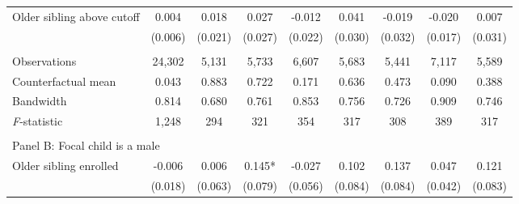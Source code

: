 \begin{table}[!htbp]
{{\begin{tabular}{lcccccccc}
Older sibling above cutoff&       0.004   &       0.018   &       0.027   &      -0.012   &       0.041   &      -0.019   &      -0.020   &       0.007   \\
                    &     (0.006)   &     (0.021)   &     (0.027)   &     (0.022)   &     (0.030)   &     (0.032)   &     (0.017)   &     (0.031)   \\
                    &               &               &               &               &               &               &               &               \\
Observations        &      24,302   &       5,131   &       5,733   &       6,607   &       5,683   &       5,441   &       7,117   &       5,589   \\
Counterfactual mean &       0.043   &       0.883   &       0.722   &       0.171   &       0.636   &       0.473   &       0.090   &       0.388   \\
Bandwidth           &       0.814   &       0.680   &       0.761   &       0.853   &       0.756   &       0.726   &       0.909   &       0.746   \\
\textit{F}-statistic&       1,248   &         294   &         321   &         354   &         317   &         308   &         389   &         317   \\
 
&  &  &  &  \\
\multicolumn{10}{l}{Panel B: Focal child is a male} \\
Older sibling enrolled&      -0.006   &       0.006   &       0.145*  &      -0.027   &       0.102   &       0.137   &       0.047   &       0.121   \\
                    &     (0.018)   &     (0.063)   &     (0.079)   &     (0.056)   &     (0.084)   &     (0.084)   &     (0.042)   &     (0.083)   \\
 

\end{tabular}}}
\end{table}
